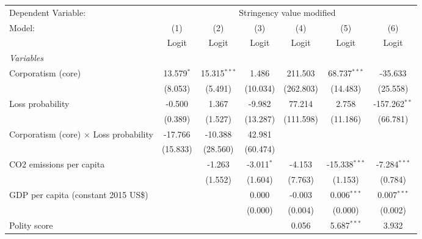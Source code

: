 
\begingroup
\centering
\begin{tabular}{lcccccc}
   \toprule
   Dependent Variable: & \multicolumn{6}{c}{Stringency value modified}\\
   Model:                                        & (1)          & (2)            & (3)          & (4)       & (5)             & (6)\\  
                                                 &  Logit       & Logit          & Logit        & Logit     & Logit           & Logit\\  
   \midrule
   \emph{Variables}\\
   Corporatism (core)                            & 13.579$^{*}$ & 15.315$^{***}$ & 1.486        & 211.503   & 68.737$^{***}$  & -35.633\\   
                                                 & (8.053)      & (5.491)        & (10.034)     & (262.803) & (14.483)        & (25.558)\\   
   Loss probability                              & -0.500       & 1.367          & -9.982       & 77.214    & 2.758           & -157.262$^{**}$\\   
                                                 & (0.389)      & (1.527)        & (13.287)     & (111.598) & (11.186)        & (66.781)\\   
   Corporatism (core) $\times$ Loss probability  & -17.766      & -10.388        & 42.981       &           &                 &   \\   
                                                 & (15.833)     & (28.560)       & (60.474)     &           &                 &   \\   
   CO2 emissions per capita                      &              & -1.263         & -3.011$^{*}$ & -4.153    & -15.338$^{***}$ & -7.284$^{***}$\\   
                                                 &              & (1.552)        & (1.604)      & (7.763)   & (1.153)         & (0.784)\\   
   GDP per capita (constant 2015 US\$)           &              &                & 0.000        & -0.003    & 0.006$^{***}$   & 0.007$^{***}$\\   
                                                 &              &                & (0.000)      & (0.004)   & (0.000)         & (0.002)\\   
   Polity score                                  &              &                &              & 0.056     & 5.687$^{***}$   & 3.932\\   

\end{tabular}
